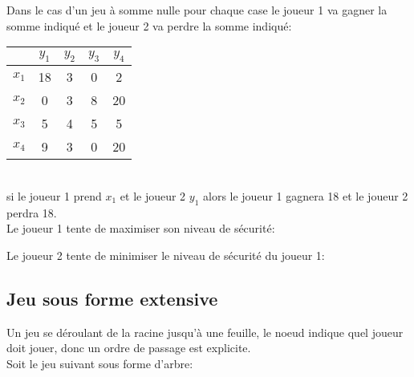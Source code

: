 Dans le cas d'un jeu à somme nulle pour chaque case le joueur 1 va gagner la somme indiqué et le joueur 2 va perdre la somme indiqué:\\
\begin{center}
\begin{tabular}{c|cccc}
$ $ & $y_1$ & $y_2$ & $y_3$ & $y_4$ \\
\hline
$x_1$ & 18 & 3 & 0 & 2\\
$x_2$ & 0 & 3 & 8 & 20\\
$x_3$ & 5 & 4 & 5 & 5\\
$x_4$ & 9 & 3 & 0 & 20\\
\end{tabular}
\end{center}
\ \\
si le joueur 1 prend $x_1$ et le joueur 2 $y_1$ alors le joueur 1 gagnera 18 et le joueur 2 perdra 18.\\

Le joueur 1 tente de maximiser son niveau de sécurité:

Le joueur 2 tente de minimiser le niveau de sécurité du joueur 1:

\subsection{Jeu sous forme extensive}

Un jeu se déroulant de la racine jusqu'à une feuille, le noeud indique quel joueur doit jouer, donc un ordre de passage est explicite.\\

Soit le jeu suivant sous forme d'arbre:

\begin{center}
\end{center}

